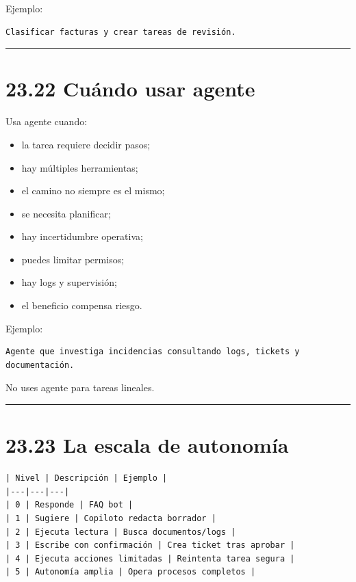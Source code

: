 Ejemplo:

\begin{lstlisting}
Clasificar facturas y crear tareas de revisión.
\end{lstlisting}

\begin{center}\rule{0.5\linewidth}{0.5pt}\end{center}

\section{23.22 Cuándo usar agente}\label{cuuxe1ndo-usar-agente}

Usa agente cuando:

\begin{itemize}
\tightlist
\item
  la tarea requiere decidir pasos;
\item
  hay múltiples herramientas;
\item
  el camino no siempre es el mismo;
\item
  se necesita planificar;
\item
  hay incertidumbre operativa;
\item
  puedes limitar permisos;
\item
  hay logs y supervisión;
\item
  el beneficio compensa riesgo.
\end{itemize}

Ejemplo:

\begin{lstlisting}
Agente que investiga incidencias consultando logs, tickets y documentación.
\end{lstlisting}

No uses agente para tareas lineales.

\begin{center}\rule{0.5\linewidth}{0.5pt}\end{center}

\section{23.23 La escala de autonomía}\label{la-escala-de-autonomuxeda}

\begin{lstlisting}
| Nivel | Descripción | Ejemplo |
|---|---|---|
| 0 | Responde | FAQ bot |
| 1 | Sugiere | Copiloto redacta borrador |
| 2 | Ejecuta lectura | Busca documentos/logs |
| 3 | Escribe con confirmación | Crea ticket tras aprobar |
| 4 | Ejecuta acciones limitadas | Reintenta tarea segura |
| 5 | Autonomía amplia | Opera procesos completos |
\end{lstlisting}

